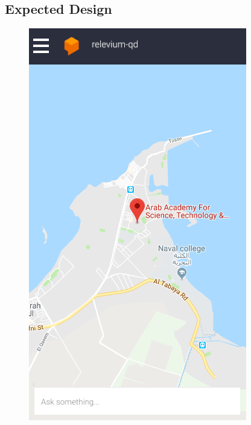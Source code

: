 \documentclass{scrreprt}
\begin{document}
  \subsection{Expected Design}
  \begin{figure}[ht!]
    \centering
    \includegraphics[height=0.3\textheight]{AppDesign/expectedDesign/1.png}
    \qquad

\end{figure}
\end{document}
